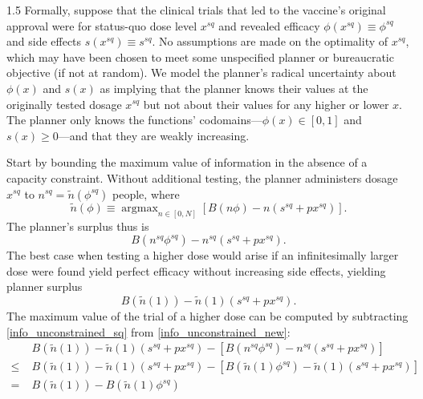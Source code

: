 \documentclass[12pt]{article}
\DeclareMathOperator*{\argmax}{argmax}
\newcommand{\efficacy}{\phi}
\newcommand{\side}{s}
\newcommand{\sqdose}{x^{sq}}
\newcommand{\sqefficacy}{\efficacy^{sq}}
\newcommand{\sqside}{\side^{sq}}
\newcommand{\sqnumber}{n^{sq}}
\newcommand{\benefit}{B}
\begin{document}
\begin{spacing}{1.5}
Formally, suppose that the clinical trials that led to the vaccine's original approval were for status-quo dose level $\sqdose$ and revealed efficacy $\efficacy(\sqdose) \equiv \sqefficacy$ and side effects $\side(\sqdose) \equiv \sqside$. No assumptions are made on the optimality of $\sqdose$, which may have been chosen to meet some unspecified planner or bureaucratic objective (if not at random). We model the planner's radical uncertainty about $\efficacy(x)$ and $\side(x)$ as implying that the planner knows their values at the originally tested dosage $\sqdose$ but not about their values for any higher or lower $x$. The planner only knows the functions' codomains---$\efficacy(x) \in [0,1]$ and $\side(x) \geq 0$---and that they are weakly increasing. 

Start by bounding the maximum value of information in the absence of a capacity constraint. Without additional testing, the planner administers dosage $\sqdose$ to $\sqnumber = \tilde{n}(\sqefficacy)$ people, where 
\begin{equation}
\label{info_unconstrained_max}
\tilde{n}(\efficacy) \equiv \argmax_{n \in [0,N]} \left[ \benefit(n \efficacy) - n (\sqside + p \sqdose) \right].
\end{equation}
The planner's surplus thus is
\begin{equation}
\label{info_unconstrained_sq}
\benefit(\sqnumber \sqefficacy) - \sqnumber (\sqside + p \sqdose).
\end{equation}
The best case when testing a higher dose would arise if an infinitesimally larger dose were found yield perfect efficacy without increasing side effects, yielding planner surplus
\begin{equation}
\label{info_unconstrained_new}
\benefit(\tilde{n}(1)) - \tilde{n}(1) (\sqside + p \sqdose).
\end{equation}
The maximum value of the trial of a higher dose can be computed by subtracting \eqref{info_unconstrained_sq} from \eqref{info_unconstrained_new}: 
\begin{align}
& B(\tilde{n}(1)) - \tilde{n}(1) ( \sqside + p \sqdose) - \left[ \benefit(\sqnumber \sqefficacy) - \sqnumber ( \sqside + p \sqdose) \right] \label{info_unconstrained_diff1} \\
\leq \; & B(\tilde{n}(1)) - \tilde{n}(1)( \sqside + p \sqdose) - \left[ \benefit(\tilde{n}(1) \sqefficacy) - \tilde{n}(1) ( \sqside + p \sqdose) \right]  \label{info_constrained_diff2} \\
= \; & \benefit(\tilde{n}(1)) - \benefit(\tilde{n}(1) \sqefficacy)  \label{info_constrained_diff3} \\

\end{align}
\end{spacing}
\end{document}
